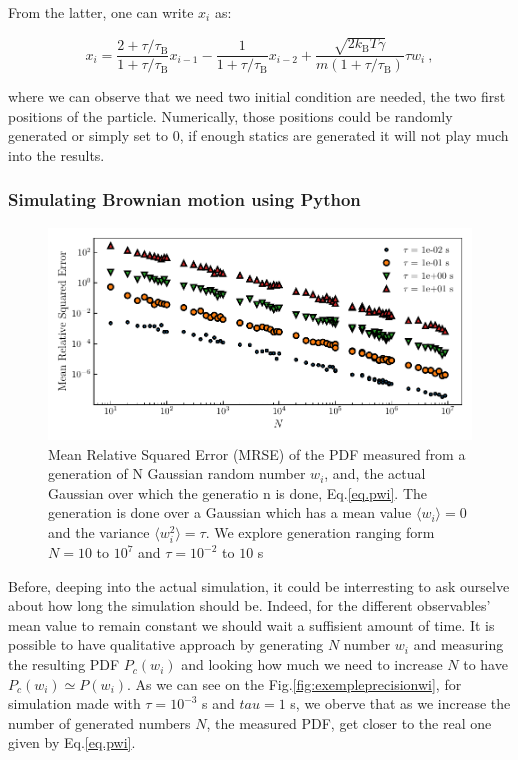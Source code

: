 From the latter, one can write $x_i$ as:

\begin{equation}	
	x_i = \frac{2 + \tau /\tau_\mathrm{B}}{1 + \tau / \tau_\mathrm{B} } x_{i-1} 
	- \frac{1}{1 + \tau / \tau_\mathrm{B}}x_{i-2}
	+ \frac{\sqrt{2k_\mathrm{B}T\gamma}}{m(1 + \tau/\tau_\mathrm{B})} \tau w_i ~,
	\label{Eq.numfulllangevin}
\end{equation}

where we can observe that we need two initial condition are needed, the two first positions of  the particle. Numerically, those positions could be randomly generated or simply set to $0$, if enough statics are generated it will not play much into the results.

\subsubsection{Simulating Brownian motion using Python}

\begin{figure}[h]
	\centering
	\includegraphics{02_body/chapter1/image/noise_simulation/MSE.pdf}
	\caption{Mean Relative Squared Error (\gls{MRSE}) of the \gls{PDF} measured from a generation of N Gaussian random number $w_i$, and, the actual Gaussian over which the generatio n is done, Eq.\ref{eq.pwi}. The generation is done over a Gaussian which has a mean value $\langle w_i \rangle =0$ and the variance $\langle w_i^2 \rangle = \tau$. We explore generation ranging form $N = 10$ to $10^7$ and $\tau = 10^{-2}$ to $10$ s}  
	\label{fig:MSEwi}
\end{figure}

Before, deeping into the actual simulation, it could be interresting to ask ourselve about how long the simulation should be. Indeed, for the different observables' mean value to remain constant we should wait a suffisient amount of time. It is possible to have qualitative approach by generating $N$ number $w_i$ and measuring the resulting \gls{PDF} $P_c(w_i)$ and looking how much we need to increase $N$ to have $P_c(w_i) \simeq P(w_i)$. As we can see on the Fig.\ref{fig:exempleprecisionwi}, for simulation made with $\tau = 10^{-3}$ s and $tau = 1$ s, we oberve that as we increase the number of generated numbers $N$, the measured PDF, get closer to the real one given by Eq.\ref{eq.pwi}. 




